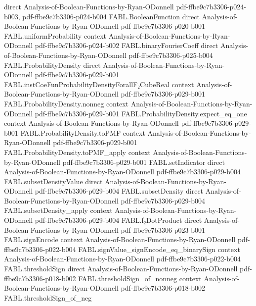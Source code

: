 \begin{theorem}
  {direct}
  {Analysis-of-Boolean-Functions-by-Ryan-ODonnell}
  {pdf-ffbe9c7b3306-p024-b003,
    pdf-ffbe9c7b3306-p024-b004}
\proofstep
  {FABL.BooleanFunction}
  {direct}
  {Analysis-of-Boolean-Functions-by-Ryan-ODonnell}
  {pdf-ffbe9c7b3306-p020-b001}
\proofstep
  {FABL.uniformProbability}
  {context}
  {Analysis-of-Boolean-Functions-by-Ryan-ODonnell}
  {pdf-ffbe9c7b3306-p024-b002}
\proofstep
  {FABL.binaryFourierCoeff}
  {direct}
  {Analysis-of-Boolean-Functions-by-Ryan-ODonnell}
  {pdf-ffbe9c7b3306-p025-b004}
\proofstep
  {FABL.ProbabilityDensity}
  {direct}
  {Analysis-of-Boolean-Functions-by-Ryan-ODonnell}
  {pdf-ffbe9c7b3306-p029-b001}
\proofstep
  {FABL.instCoeFunProbabilityDensityForallF₂CubeReal}
  {context}
  {Analysis-of-Boolean-Functions-by-Ryan-ODonnell}
  {pdf-ffbe9c7b3306-p029-b001}
\proofstep
  {FABL.ProbabilityDensity.nonneg}
  {context}
  {Analysis-of-Boolean-Functions-by-Ryan-ODonnell}
  {pdf-ffbe9c7b3306-p029-b001}
\proofstep
  {FABL.ProbabilityDensity.expect_eq_one}
  {context}
  {Analysis-of-Boolean-Functions-by-Ryan-ODonnell}
  {pdf-ffbe9c7b3306-p029-b001}
\proofstep
  {FABL.ProbabilityDensity.toPMF}
  {context}
  {Analysis-of-Boolean-Functions-by-Ryan-ODonnell}
  {pdf-ffbe9c7b3306-p029-b001}
\proofstep
  {FABL.ProbabilityDensity.toPMF_apply}
  {context}
  {Analysis-of-Boolean-Functions-by-Ryan-ODonnell}
  {pdf-ffbe9c7b3306-p029-b001}
\proofstep
  {FABL.setIndicator}
  {direct}
  {Analysis-of-Boolean-Functions-by-Ryan-ODonnell}
  {pdf-ffbe9c7b3306-p029-b004}
\proofstep
  {FABL.subsetDensityValue}
  {direct}
  {Analysis-of-Boolean-Functions-by-Ryan-ODonnell}
  {pdf-ffbe9c7b3306-p029-b004}
\proofstep
  {FABL.subsetDensity}
  {direct}
  {Analysis-of-Boolean-Functions-by-Ryan-ODonnell}
  {pdf-ffbe9c7b3306-p029-b004}
\proofstep
  {FABL.subsetDensity_apply}
  {context}
  {Analysis-of-Boolean-Functions-by-Ryan-ODonnell}
  {pdf-ffbe9c7b3306-p029-b004}
\proofstep
  {FABL.f₂DotProduct}
  {direct}
  {Analysis-of-Boolean-Functions-by-Ryan-ODonnell}
  {pdf-ffbe9c7b3306-p023-b001}
\proofstep
  {FABL.signEncode}
  {context}
  {Analysis-of-Boolean-Functions-by-Ryan-ODonnell}
  {pdf-ffbe9c7b3306-p022-b004}
\proofstep
  {FABL.signValue_signEncode_eq_binarySign}
  {context}
  {Analysis-of-Boolean-Functions-by-Ryan-ODonnell}
  {pdf-ffbe9c7b3306-p022-b004}
\proofstep
  {FABL.thresholdSign}
  {direct}
  {Analysis-of-Boolean-Functions-by-Ryan-ODonnell}
  {pdf-ffbe9c7b3306-p018-b002}
\proofstep
  {FABL.thresholdSign_of_nonneg}
  {context}
  {Analysis-of-Boolean-Functions-by-Ryan-ODonnell}
  {pdf-ffbe9c7b3306-p018-b002}
\proofstep
  {FABL.thresholdSign_of_neg}

\end{theorem}
